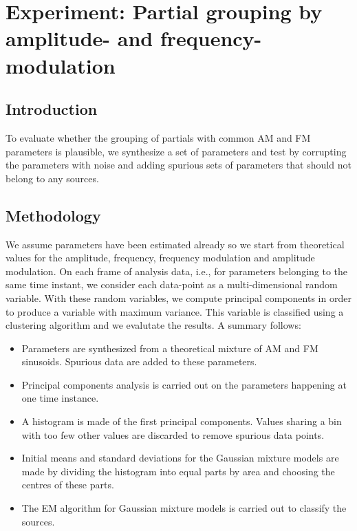 \chapter{Experiment: Partial grouping by amplitude- and
frequency-modulation\label{chap:amfmsep}}

\section{Introduction}
To evaluate whether the grouping of partials with common AM and FM parameters is
plausible, we synthesize a set of parameters and test by corrupting the
parameters with noise and adding spurious sets of parameters that should not
belong to any sources.

\section{Methodology}
We assume parameters have been estimated already so we start from theoretical
values for the amplitude, frequency, frequency modulation and amplitude
modulation.  On each frame of analysis data, i.e., for parameters belonging to
the same time instant, we consider each data-point as a multi-dimensional random
variable. With these random variables, we compute principal components in order
to produce a variable with maximum variance. This variable is classified using a
clustering algorithm and we evalutate the results. A summary follows:
\begin{itemize}
    \item 
        Parameters are synthesized from a theoretical mixture of AM and FM
        sinusoids.  Spurious data are added to these parameters.
    \item
        Principal components analysis is carried out on the parameters happening
        at one time instance.
    \item
        A histogram is made of the first principal components. Values sharing a
        bin with too few other values are discarded to remove spurious data
        points.
    \item
        Initial means and standard deviations for the Gaussian mixture models
        are made by dividing the histogram into equal parts by area and choosing
        the centres of these parts.
    \item
        The EM algorithm for Gaussian mixture models is carried out to classify
        the sources.
\end{itemize}
